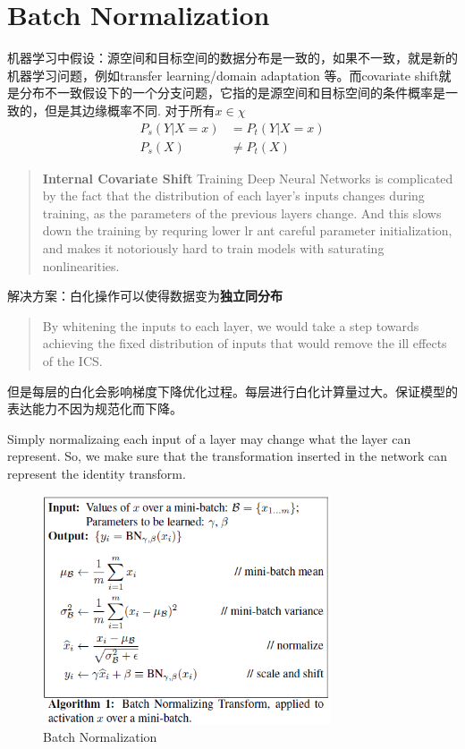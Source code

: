 \section{Batch Normalization}
机器学习中假设：源空间和目标空间的数据分布是一致的，如果不一致，就是新的机器学习问题，例如transfer learning/domain adaptation
等。而covariate shift就是分布不一致假设下的一个分支问题，它指的是源空间和目标空间的条件概率是一致的，但是其边缘概率不同.
对于所有$x \in \chi $
\begin{equation}
    \begin{split}
        P_s(Y|X = x) &= P_t(Y|X = x) \\
        P_s(X) &\neq P_t(X)
    \end{split}
\end{equation}
\begin{quotation}
    \textbf{Internal Covariate Shift} Training Deep Neural Networks is complicated by the fact that the distribution of each layer's inputs
changes during training, as the parameters of the previous layers change. And this slows down the training
by requring lower lr ant careful parameter initialization, and makes it notoriously hard to train models
with saturating nonlinearities.
\end{quotation}
解决方案：白化操作可以使得数据变为\textbf{独立同分布}
\begin{quotation}
    By whitening the inputs to each layer, we would take a step towards achieving the fixed distribution
    of inputs that would remove the ill effects of the ICS.
\end{quotation}
但是每层的白化会影响梯度下降优化过程。每层进行白化计算量过大。保证模型的表达能力不因为规范化而下降。

Simply normalizaing each input of a layer may change what the layer can represent. So, we make sure that
the transformation inserted in the network can represent the identity transform.
\begin{figure}[H]
    \centering
    \includegraphics[width=8.5cm]{images/bn_algorithm.png}
    \caption{Batch Normalization}
    \label{fig:batchnorm}
\end{figure}

